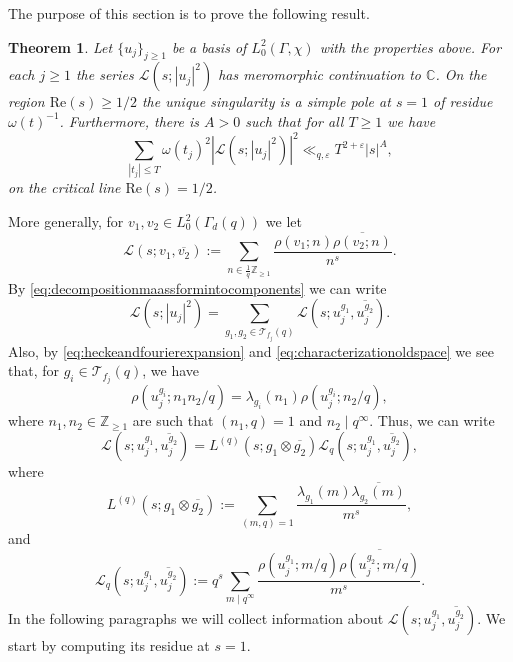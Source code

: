 \documentclass{article}
\newtheorem{thm}{Theorem}[section]
\theoremstyle{named}
\newcommand{\Z}{\mathbb{Z}}
\renewcommand{\L}{\mathcal{L}}
\newcommand{\CC}{\mathbb{C}}
\newcommand{\T}{\mathcal{T}}
\begin{document}
The purpose of this section is to prove the following result. 
\begin{thm}\label{thm:informationaboutrankinselberg}
Let $\{u_j\}_{j \geq 1}$ be a basis of $L_0^2(\Gamma, \chi)$ with the properties above. For each $j\geq 1$ the series $\L(s; |u_j|^2)$ has meromorphic continuation to $\CC$. On the region $\text{Re}(s) \geq 1/2$ the unique singularity is a simple pole at $s = 1$ of residue $\omega(t)^{-1}$. Furthermore, there is $A > 0$ such that for all $T \geq 1$ we have 
\begin{equation}\label{eq:lindelofonaverage}
   \sum_{|t_j| \leq T} \omega(t_j)^2|\L(s; |u_j|^2)|^2 \ll_{q, \varepsilon} T^{2 + \varepsilon}|s|^{A},  
\end{equation}
on the critical line $\text{Re}(s) = 1/2$. 
\end{thm}

More generally, for $v_1, v_2 \in L_0^2(\Gamma_d(q))$ we let 
\begin{equation*}
    \L(s; v_1, \overline{v_2}) := \sum_{n \in \frac{1}{q}\Z_{\geq 1}} \frac{\rho(v_1; n) \overline{\rho(v_2; n)}}{n^s}.
\end{equation*}
By \eqref{eq:decompositionmaassformintocomponents} we can write 
\begin{equation}\label{eq:naiverankinselbergdecomposition}
\L(s; |u_j|^2) = \sum_{g_1, g_2 \in \T_{f_j}(q)} \L(s; u_j^{g_1}, \overline{u_j^{g_2}}).
\end{equation}
Also, by \eqref{eq:heckeandfourierexpansion} and \eqref{eq:characterizationoldspace} we see that, for $g_i \in \T_{f_j}(q)$, we have
\begin{equation*}
    \rho(u_j^{g_i}; n_1 n_2/q) = \lambda_{g_i}(n_1)\rho(u_j^{g_i}; n_2/q),
\end{equation*}
where $n_1, n_2 \in \Z_{\geq 1}$ are such that $(n_1, q) = 1$ and $n_2 \mid q^\infty$. Thus, we can write 
\begin{equation}\label{eq:structuralformularankinselberg}
    \L(s; u_j^{g_1}, \overline{u_j^{g_2}}) = L^{(q)}(s; g_1 \otimes \overline{g_2})\L_q(s; u_j^{g_1},  \overline{u_j^{g_2}}),
\end{equation}
where 
\begin{equation}\label{eq:partialproductrankinselberg}
    L^{(q)}(s;  g_1 \otimes \overline{g_2}) := \sum_{(m, q) = 1}\frac{\lambda_{g_1}(m)\overline{\lambda_{g_2}(m)}}{m^s},
\end{equation}
and 
\begin{equation}\label{eq:definitionofbadfactorsrankinselberg}
    \L_q(s; u_j^{g_1},  \overline{u_j^{g_2}}) := q^s \sum_{m \mid q^\infty} \frac{\rho(u_j^{g_1}; m/q)\overline{\rho(u_j^{g_2}; m/q)}}{m^s}.
\end{equation}
In the following paragraphs we will collect information about $\L(s; u_j^{g_1}, \overline{u_j^{g_2}})$. We start by computing its residue at $s = 1$. 
\end{document}
